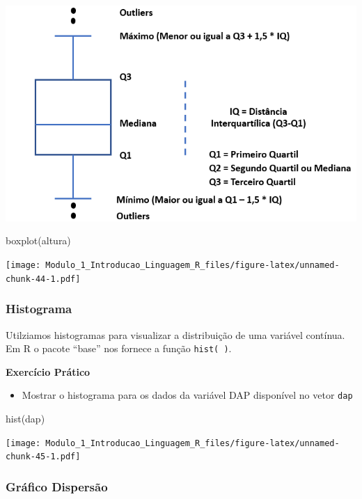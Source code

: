 \documentclass[
]{article}
\newenvironment{Shaded}{\begin{snugshade}}{\end{snugshade}}
\newcommand{\FunctionTok}[1]{\textcolor[rgb]{0.00,0.00,0.00}{#1}}
\newcommand{\NormalTok}[1]{#1}
\providecommand{\tightlist}{%
  \setlength{\itemsep}{0pt}\setlength{\parskip}{0pt}}
\begin{document}
\includegraphics{./data/boxplot.png}

\begin{Shaded}
\begin{Highlighting}[]
\FunctionTok{boxplot}\NormalTok{(altura)}
\end{Highlighting}
\end{Shaded}

\texttt{[image: Modulo\_1\_Introducao\_Linguagem\_R\_files/figure-latex/unnamed-chunk-44-1.pdf]}

\hypertarget{histograma}{%
\subsubsection{Histograma}\label{histograma}}

Utilziamos histogramas para visualizar a distribuição de uma variável
contínua. Em R o pacote ``base'' nos fornece a função \texttt{hist(\ )}.

\textbf{Exercício Prático}

\begin{itemize}
\tightlist
\item
  Mostrar o histograma para os dados da variável DAP disponível no vetor
  \texttt{dap}
\end{itemize}

\begin{Shaded}
\begin{Highlighting}[]
\FunctionTok{hist}\NormalTok{(dap)}
\end{Highlighting}
\end{Shaded}

\texttt{[image: Modulo\_1\_Introducao\_Linguagem\_R\_files/figure-latex/unnamed-chunk-45-1.pdf]}

\hypertarget{gruxe1fico-dispersuxe3o}{%
\subsubsection{Gráfico Dispersão}\label{gruxe1fico-dispersuxe3o}}
\end{document}
